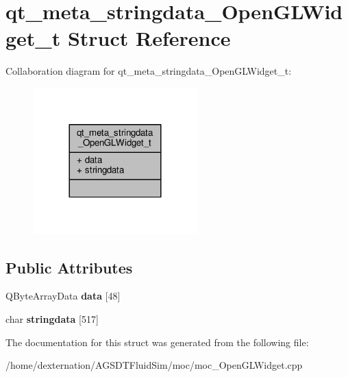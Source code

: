 \hypertarget{structqt__meta__stringdata___open_g_l_widget__t}{\section{qt\-\_\-meta\-\_\-stringdata\-\_\-\-Open\-G\-L\-Widget\-\_\-t Struct Reference}
\label{structqt__meta__stringdata___open_g_l_widget__t}
}


Collaboration diagram for qt\-\_\-meta\-\_\-stringdata\-\_\-\-Open\-G\-L\-Widget\-\_\-t\-:\nopagebreak
\begin{figure}[H]
\begin{center}
\leavevmode
\includegraphics[width=180pt]{structqt__meta__stringdata___open_g_l_widget__t__coll__graph}
\end{center}
\end{figure}
\subsection*{Public Attributes}
\begin{DoxyCompactItemize}
\item 
\hypertarget{structqt__meta__stringdata___open_g_l_widget__t_ad12a546ae59866732c758206e9e72938}{Q\-Byte\-Array\-Data {\bfseries data} \mbox{[}48\mbox{]}}\label{structqt__meta__stringdata___open_g_l_widget__t_ad12a546ae59866732c758206e9e72938}

\item 
\hypertarget{structqt__meta__stringdata___open_g_l_widget__t_a356daa95022344d6aa7de96775220623}{char {\bfseries stringdata} \mbox{[}517\mbox{]}}\label{structqt__meta__stringdata___open_g_l_widget__t_a356daa95022344d6aa7de96775220623}

\end{DoxyCompactItemize}


The documentation for this struct was generated from the following file\-:\begin{DoxyCompactItemize}
\item 
/home/dexternation/\-A\-G\-S\-D\-T\-Fluid\-Sim/moc/moc\-\_\-\-Open\-G\-L\-Widget.\-cpp\end{DoxyCompactItemize}
